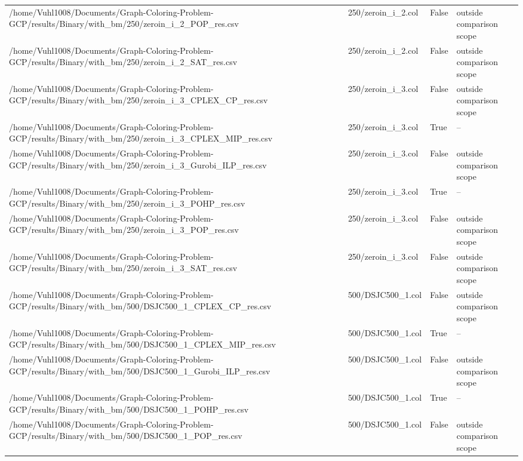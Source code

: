 \begin{table}[htbp]
\begin{tabular}{llll}
/home/Vuhl1008/Documents/Graph-Coloring-Problem-GCP/results/Binary/with\_bm/250/zeroin\_i\_2\_POP\_res.csv & 250/zeroin\_i\_2.col & False & outside comparison scope \\
/home/Vuhl1008/Documents/Graph-Coloring-Problem-GCP/results/Binary/with\_bm/250/zeroin\_i\_2\_SAT\_res.csv & 250/zeroin\_i\_2.col & False & outside comparison scope \\
/home/Vuhl1008/Documents/Graph-Coloring-Problem-GCP/results/Binary/with\_bm/250/zeroin\_i\_3\_CPLEX\_CP\_res.csv & 250/zeroin\_i\_3.col & False & outside comparison scope \\
/home/Vuhl1008/Documents/Graph-Coloring-Problem-GCP/results/Binary/with\_bm/250/zeroin\_i\_3\_CPLEX\_MIP\_res.csv & 250/zeroin\_i\_3.col & True & -- \\
/home/Vuhl1008/Documents/Graph-Coloring-Problem-GCP/results/Binary/with\_bm/250/zeroin\_i\_3\_Gurobi\_ILP\_res.csv & 250/zeroin\_i\_3.col & False & outside comparison scope \\
/home/Vuhl1008/Documents/Graph-Coloring-Problem-GCP/results/Binary/with\_bm/250/zeroin\_i\_3\_POHP\_res.csv & 250/zeroin\_i\_3.col & True & -- \\
/home/Vuhl1008/Documents/Graph-Coloring-Problem-GCP/results/Binary/with\_bm/250/zeroin\_i\_3\_POP\_res.csv & 250/zeroin\_i\_3.col & False & outside comparison scope \\
/home/Vuhl1008/Documents/Graph-Coloring-Problem-GCP/results/Binary/with\_bm/250/zeroin\_i\_3\_SAT\_res.csv & 250/zeroin\_i\_3.col & False & outside comparison scope \\
/home/Vuhl1008/Documents/Graph-Coloring-Problem-GCP/results/Binary/with\_bm/500/DSJC500\_1\_CPLEX\_CP\_res.csv & 500/DSJC500\_1.col & False & outside comparison scope \\
/home/Vuhl1008/Documents/Graph-Coloring-Problem-GCP/results/Binary/with\_bm/500/DSJC500\_1\_CPLEX\_MIP\_res.csv & 500/DSJC500\_1.col & True & -- \\
/home/Vuhl1008/Documents/Graph-Coloring-Problem-GCP/results/Binary/with\_bm/500/DSJC500\_1\_Gurobi\_ILP\_res.csv & 500/DSJC500\_1.col & False & outside comparison scope \\
/home/Vuhl1008/Documents/Graph-Coloring-Problem-GCP/results/Binary/with\_bm/500/DSJC500\_1\_POHP\_res.csv & 500/DSJC500\_1.col & True & -- \\
/home/Vuhl1008/Documents/Graph-Coloring-Problem-GCP/results/Binary/with\_bm/500/DSJC500\_1\_POP\_res.csv & 500/DSJC500\_1.col & False & outside comparison scope \\

\end{tabular}
\end{table}

